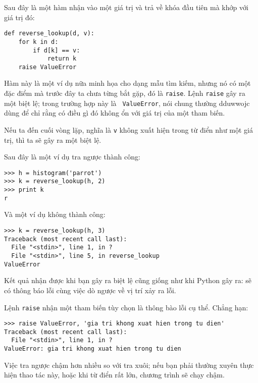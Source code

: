 \documentclass[11pt]{book}
\begin{document}
Sau đây là một hàm nhận vào một giá trị và trả về khóa đầu tiên
mà khớp với giá trị đó:

\beforeverb
\begin{verbatim}
def reverse_lookup(d, v):
    for k in d:
        if d[k] == v:
            return k
    raise ValueError
\end{verbatim}
\afterverb
%
Hàm này là một ví dụ nữa minh họa cho dạng mẫu tìm kiếm, nhưng nó
có một đặc điểm mà trước đây ta chưa từng bắt gặp, đó là {\tt raise}.
Lệnh {\tt raise} gây ra một biệt lệ; trong trường hợp này là {\tt
  ValueError}, nói chung thường dduwwojc dùng để chỉ rằng có 
điều gì đó không ổn với giá trị của một tham biến.


Nếu ta đến cuối vòng lặp, nghĩa là {\tt v} không xuất hiện trong
từ điển như một giá trị, thì ta sẽ gây ra một biệt lệ.

Sau đây là một ví dụ tra ngược thành công:

\beforeverb
\begin{verbatim}
>>> h = histogram('parrot')
>>> k = reverse_lookup(h, 2)
>>> print k
r
\end{verbatim}
\afterverb
%
Và một ví dụ không thành công:

\beforeverb
\begin{verbatim}
>>> k = reverse_lookup(h, 3)
Traceback (most recent call last):
  File "<stdin>", line 1, in ?
  File "<stdin>", line 5, in reverse_lookup
ValueError
\end{verbatim}
\afterverb
%
Kết quả nhận được khi bạn gây ra biệt lệ cũng giống như khi
Python gây ra: sẽ có thông báo lỗi cùng việc dò ngược về
vị trí xảy ra lỗi.


Lệnh {\tt raise} nhận một tham biến tùy chọn là thông bào lỗi cụ thể.
Chẳng hạn:

\beforeverb
\begin{verbatim}
>>> raise ValueError, 'gia tri khong xuat hien trong tu dien'
Traceback (most recent call last):
  File "<stdin>", line 1, in ?
ValueError: gia tri khong xuat hien trong tu dien
\end{verbatim}
\afterverb
%
Việc tra ngược chậm hơn nhiều so với tra xuôi; nếu bạn phải thường
xuyên thực hiện thao tác này, hoặc khi từ điển rất lớn, chương trình
sẽ chạy chậm.
\end{document}
